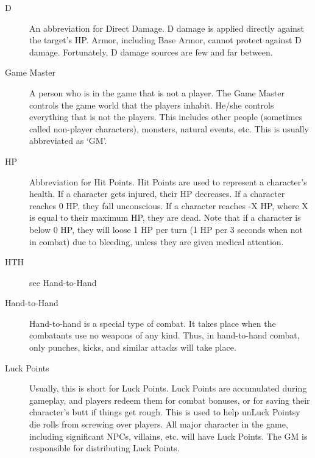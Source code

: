 \documentclass[twoside]{book}
\begin{document}
\begin{description}
{    }
  
  \item[ D ] 
    {  
      An abbreviation for Direct Damage. D damage is
                 applied directly against the target's HP. Armor,
                 including Base Armor, cannot protect against D damage.
                 Fortunately, D damage sources are few and far between.
                 
    }
  
  \item[ Game Master ] 
    {  
      A person who is in the game that is not a player.
                 The Game Master controls the game world that the players
                 inhabit. He/she controls everything that is not the
                 players. This includes other people (sometimes called
                 non-player characters), monsters, natural events, etc.
                 This is usually abbreviated as `GM'. 
    }
  
  \item[ HP ] 
    {  
      Abbreviation for Hit Points. Hit Points are used
                 to represent a character's health. If a character
                 gets injured, their HP decreases. If a character reaches
                 0 HP, they fall unconscious. If a character reaches -X
                 HP, where X is equal to their maximum HP, they are dead.
                 Note that if a character is below 0 HP, they will loose
                 1 HP per turn (1 HP per 3 seconds when not in combat)
                 due to bleeding, unless they are given medical
                 attention. 
    }
  
  \item[ HTH ] 
    {  
      see Hand-to-Hand 
    }
  
  \item[ Hand-to-Hand ] 
    {  
      Hand-to-hand is a special type of combat. It
                 takes place when the combatants use no weapons of any
                 kind. Thus, in hand-to-hand combat, only punches, kicks,
                 and similar attacks will take place. 
    }
  
  \item[ Luck Points ] 
    {  
      Usually, this is short for Luck Points. Luck
                 Points are accumulated during gameplay, and players
                 redeem them for combat bonuses, or for saving their
                 character's butt if things get rough. This is used
                 to help unLuck Pointsy die rolls from screwing over
                 players. All major character in the game, including
                 significant NPCs, villains, etc. will have Luck Points.
                 The GM is responsible for distributing Luck Points.
                 
}
\end{description}
\end{document}
